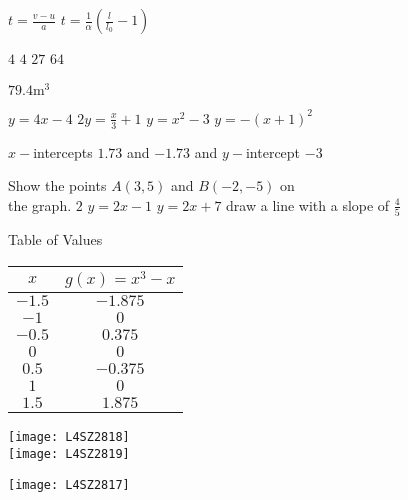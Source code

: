\begin{Answer}[ref={ex12}]%
	\Question %
\begin{tasks}
	\task 	 $t =\frac{v -u}{a}$ 
	\task    $t =\frac{1}{\alpha } \left (\frac{l}{l_{0}} -1\right )$
\end{tasks}

\Question %
\begin{tasks}
	\task 	 $4$
	\task    $4$	
	\task 	 $27$
	\task    $64$
\end{tasks}

\Question $79.4 \mathrm{m}^{3}$

\Question %
\begin{tasks}
	\task 	 $y=4x-4$
	\task    $2y=\frac{x}{3}+1$	
	\task 	 $y =x^{2} -3$ 
	\task    $y =-(x+1)^{2}$ 
\end{tasks}

\Question %
$x-$intercepts $1.73$ and $ -1.73$ and $y-$intercept $ -3$

\Question %
\begin{tasks}
\task 	 Show the points $A \left (3 ,5\right )$ and $B \left ( -2 , -5\right )$ on\\ the graph.%
\task    $2$	
\task 	$y =2 x -1$ 
\task  $y =2 x +7$
\task  draw a line with a slope of $\frac{4}{5}$
\end{tasks}

\Question Table of Values\smallskip\\%
\begin{tabular}{cc}\toprule
	$x$  & $g (x) =x^3-x$  \\
	\midrule
	$ -1.5$  & $ -1.875$  \\
	\midrule
	$ -1$  & $0$  \\
	\midrule
	$ -0.5$  & $0.375$  \\
	\midrule
	$0$  & $0$  \\
	\midrule
	$0.5$  & $ -0.375$  \\
	\midrule
	$1$  & $0$  \\
	\midrule
	$1.5$  & $1.875$  \\
	\bottomrule
\end{tabular}
\Question %
\begin{tasks}
	\task 	\texttt{[image: L4SZ2818]}\\
	\task   \texttt{[image: L4SZ2819]}\\
\end{tasks}
\Question %
\texttt{[image: L4SZ2817]}
\end{Answer}%

